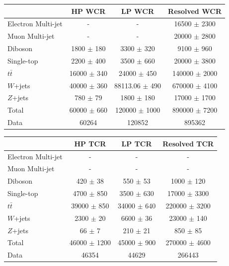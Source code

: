 \begin{table}
\begin{tabular}{|l|c|c|c|}
\hline
	  &	 HP WCR &	 LP WCR &	Resolved WCR \\\hline 
	Electron Multi-jet &	- &	- &	16500 $\pm$ 2300 \\\hline 
	Muon Multi-jet &	- &	- &	20000 $\pm$ 2800 \\\hline 
	Diboson &	1800 $\pm$ 180 &	3300 $\pm$ 320 &	9100 $\pm$ 960 \\\hline 
	Single-top &	2200 $\pm$ 400 &	3500 $\pm$ 660 &	20000 $\pm$ 3800 \\\hline 
	$t\bar{t}$ &	16000 $\pm$ 340 &	24000 $\pm$ 450&	140000 $\pm$ 2000 \\\hline 
	$W$+jets &	40000 $\pm$ 360 &	88113.06 $\pm$ 490 &	670000 $\pm$ 4100 \\\hline 
	$Z$+jets &	780 $\pm$ 79 &	1800 $\pm$ 180 &	17000 $\pm$ 1700 \\\hline 
	Total &	60000 $\pm$ 660 &	120000 $\pm$ 1000 &	890000 $\pm$ 7200 \\\hline 
	Data &	60264 &	120852 &	895362 \\\hline 
\end{tabular}

 
\begin{tabular}{|l|c|c|c|}
\hline
	  &	 HP  TCR &	 LP  TCR &	Resolved TCR \\\hline 
	Electron Multi-jet &	- &	- &	- \\\hline 
	Muon Multi-jet &	- &	- &	- \\\hline 
	Diboson &	420 $\pm$ 38 &	550 $\pm$ 53 &	1000 $\pm$ 120 \\\hline 
	Single-top &	4700 $\pm$ 850 &	3500 $\pm$ 630 &	17000 $\pm$ 3300 \\\hline 
	$t\bar{t}$ &	39000 $\pm$ 850 &	34000 $\pm$ 640 &	220000 $\pm$ 3200 \\\hline 
	$W$+jets &	2300 $\pm$ 20 &	6600 $\pm$ 36 &	23000 $\pm$ 140 \\\hline 
	$Z$+jets &	66 $\pm$ 7 &	210 $\pm$ 21 &	850 $\pm$ 85 \\\hline 
	Total &	46000 $\pm$ 1200 &	45000 $\pm$ 900 &	270000 $\pm$ 4600 \\\hline 
	Data &	46354 &	44629 &	266443 \\\hline 
\end{tabular}


\end{table}
